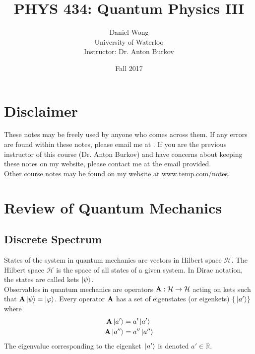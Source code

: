 \documentclass[12pt,a4paper,titlepage]{article}
\newcommand{\ul}[1]{\underline{\smash{#1}}} %
\begin{document}
\title{PHYS 434: Quantum Physics III}
\author{Daniel Wong\\University of Waterloo\\Instructor: Dr. Anton Burkov}
\date{Fall 2017}
\maketitle

\setlength\parindent{0pt}

\section*{Disclaimer}
These notes may be freely used by anyone who comes across them. If any errors are found within these notes, please email me at \ul{temp@temp.com}. If you are the previous instructor of this course (Dr. Anton Burkov) and have concerns about keeping these notes on my website, please contact me at the email provided.\\

Other course notes may be found on my website at \url{www.temp.com/notes}.

\newpage
\tableofcontents
\newpage
{}

\section{Review of Quantum Mechanics}
\subsection{Discrete Spectrum}
States of the system in quantum mechanics are vectors in Hilbert space $\mathcal{H}$. The Hilbert space $\mathcal{H}$ is the space of all states of a given system. In Dirac notation, the states are called kets $\ket{\psi}$.\\

Observables in quantum mechanics are operators $\vb{A}:\mathcal{H}\rightarrow\mathcal{H}$ acting on kets such that $\vb{A}\ket{\psi}=\ket{\varphi}$. Every operator $\vb{A}$ has a set of eigenstates (or eigenkets) $\{\ket*{a'}\}$ where
\begin{equation}
\begin{aligned}
\vb{A}\ket*{a'}&=a'\ket*{a'}\\
\vb{A}\ket*{a''}&=a''\ket*{a''}
\end{aligned}
\end{equation}
The eigenvalue corresponding to the eigenket $\ket*{a'}$ is denoted $a'\in\mathbb{R}$.\\
\end{document}

